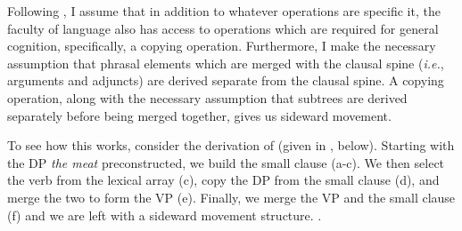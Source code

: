 \documentclass[letterpaper,12pt]{article}
\begin{document}
Following \textcite{hornstein2009theory,nunes2001sideward}, I assume that in addition to whatever operations are specific it, the faculty of language also has access to operations which are required for general cognition, specifically, a copying operation.
Furthermore, I make the necessary assumption that phrasal elements which are merged with the clausal spine (\textit{i.e.}, arguments and adjuncts) are derived separate from the clausal spine.
A copying operation, along with the necessary assumption that subtrees are derived separately before being merged together, gives us sideward movement.

To see how this works, consider the derivation of \Last (given in \Next, below).
Starting with the DP \textit{the meat} preconstructed, we build the small clause (a-c).
We then select the verb from the lexical array (c), copy the DP from the small clause (d), and merge the two to form the VP (e).
Finally, we merge the VP and the small clause (f) and we are left with a sideward movement structure.
\ex.
\end{document}
